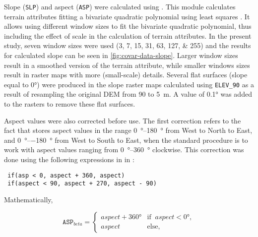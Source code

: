 Slope (\texttt{SLP}) and aspect (\texttt{ASP}) were calculated using . This 
module calculates terrain attributes fitting a bivariate quadratic polynomial using least squares 
\cite{Wood1996}. It allows using different window sizes to fit the bivariate quadratic polynomial, 
thus including the effect of scale in the calculation of terrain attributes. In the present study, 
seven window sizes were used (\numlist{3;7;15;31;63;127;255}) and the results for calculated slope 
can be seen in \autoref{fig:covar-data-slope}. Larger window sizes result in a smoothed version of 
the terrain attribute, while smaller windows sizes result in raster maps with more (small-scale) 
details. Several flat surfaces (slope equal to \ang{0}) were produced in the slope raster 
maps calculated using \texttt{ELEV\_90} as a result of resampling the original DEM from \num{90} to 
\SI{5}{\metre}. A value of \ang{0.1} was added to the rasters to remove these flat surfaces.


Aspect values were also corrected before use. The first correction refers to the fact that 
 stores aspect values in the range \SIrange{0}{+180}{\degree} from West to 
North to East, and \SIrange{0}{-180}{\degree} from West to South to East, when the standard 
procedure is to work with aspect values ranging from \SIrange{0}{360}{\degree} clockwise. This 
correction was done using the following expressions in in :

\begin{verbatim}
 if(asp < 0, aspect + 360, aspect)
 if(aspect < 90, aspect + 270, aspect - 90)
\end{verbatim}

\noindent Mathematically,

\begin{equation}
 \texttt{ASP}_{beta} =
 \begin{cases}
  aspect + \ang{360} & \text{if}\;\; aspect < \ang{0}, \\
  aspect             & \text{else},
 \end{cases}
\end{equation}

